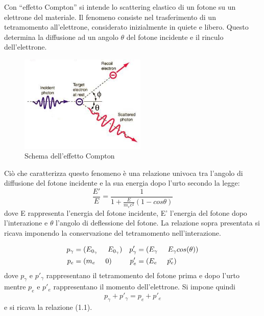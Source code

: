 \documentclass[italian,11pt]{report}
\begin{document}
\vspace{5mm}

Con “effetto Compton” si intende lo scattering elastico di un fotone su un elettrone del materiale. Il fenomeno consiste nel trasferimento di un tetramomento all’elettrone, considerato inizialmente in quiete e libero. Questo determina la diffusione ad un angolo $\theta$ del fotone incidente e il rinculo dell’elettrone.
\vspace{5mm}

\begin{figure}[htp]
\centering
\includegraphics[width=6cm]{compton.jpg}
\caption{Schema dell'effetto Compton}
\end{figure}
\vspace{5mm}

Ciò che caratterizza questo fenomeno è una relazione univoca tra l’angolo di diffusione del fotone incidente e la sua energia dopo l’urto secondo la legge: 
\begin{equation}
\frac{E'}{E} =\frac{1}{1+\frac{E}{m_{e}c^2}(1-cos\theta)}
\end{equation}
dove E rappresenta l’energia del fotone incidente, E’ l’energia del fotone dopo l’interazione e $\theta$ l’angolo di deflessione del fotone. La relazione sopra presentata si ricava imponendo la conservazione del tetramomento nell’interazione.



\begin{align*}
p_{\gamma}&=(E_{0_\gamma} \hspace{0,5cm} E_{0_\gamma}) &
p'_{\gamma}&=(E_{\gamma} \hspace{0,5cm} E_{\gamma}cos(\theta))\\
p_{e}&=(m_{e} \hspace{0,5cm} 0) &
p'_{e}&=(E_{e} \hspace{0,5cm} \vec{p_{e}})\\
\end{align*}
dove $p_{\gamma}$ e $p'_{\gamma}$ rappresentano il tetramomento del fotone prima e dopo l'urto mentre $p_{e}$ e $p'_{e}$ rappresentano il momento dell'elettrone. Si impone quindi $$p_{\gamma}+p'_{\gamma}=p_{e}+p'_{e}$$ e si ricava la relazione (1.1).
\end{document}
